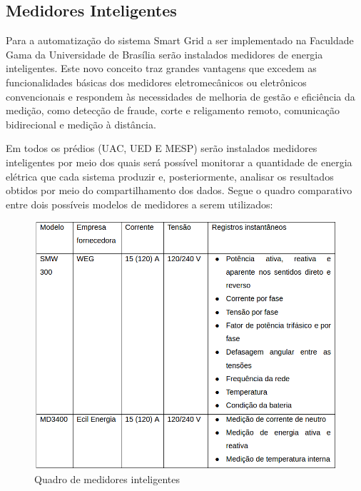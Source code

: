 \subsection{Medidores Inteligentes}
Para a automatização do sistema Smart Grid a ser implementado na Faculdade Gama da Universidade de Brasília serão instalados medidores de energia inteligentes. Este novo conceito traz grandes vantagens que excedem as funcionalidades básicas dos medidores eletromecânicos ou eletrônicos convencionais e respondem às necessidades de melhoria de gestão e eﬁciência da medição, como detecção de fraude, corte e religamento remoto, comunicação bidirecional e medição à distância.

Em todos os prédios (UAC, UED E MESP) serão instalados medidores inteligentes por meio dos quais será possível monitorar a quantidade de energia elétrica que cada sistema produzir e, posteriormente, analisar os resultados obtidos por meio do compartilhamento dos dados. Segue o quadro comparativo entre dois possíveis modelos de medidores a serem utilizados:
\begin{figure}[!h]
	\centering
	\includegraphics[width=1.0\textwidth]{figuras/quadroMedidoresInteligentes.png}
	\caption{Quadro de medidores inteligentes}
	\label{fig:medidoresinteligentes}
\end{figure}

